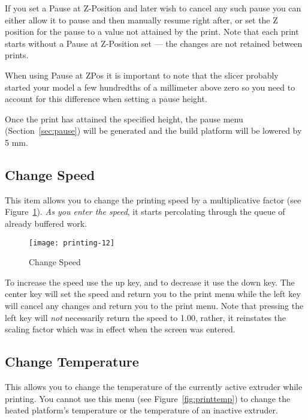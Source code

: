 If you set a Pause at Z-Position and later wish to cancel any such pause you can either allow it to pause and then manually resume right after, or set the Z position for the pause to a value not attained by the print.  Note that each print starts without a Pause at Z-Position set --- the changes are not retained between prints.

When using Pause at ZPos it is important to note that the \gls{slicer} probably started your model a few hundredths of a millimeter above zero so you need to account for this difference when setting a pause height.

Once the print has attained the specified height, the pause menu (Section~\ref{sec:pause}) will be generated and the build platform will be lowered by 5 mm.


\subsection{Change Speed}\label{sec:speed}

This item allows you to change the printing speed by a multiplicative factor (see Figure~\ref{fig:speed}).  \emph{As you enter the speed}, it starts percolating through the queue of already buffered work.

\begin{figure}[!htbp]
  \centering
    \texttt{[image: printing-12]}
    \caption{Change Speed}
  \label{fig:speed}
\end{figure}

To increase the speed use the up key, and to decrease it use the down key.  The center key will set the speed and return you to the print menu while the left key will cancel any changes and return you to the print menu.  Note that pressing the left key will \emph{not} necessarily return the speed to 1.00, rather, it reinstates the scaling factor which was in effect when the screen was entered.


\subsection{Change Temperature}\label{sec:temp}

This allows you to change the temperature of the currently active extruder while printing.  You cannot use this menu (see Figure~\ref{fig:printtemp}) to change the heated platform's temperature or the temperature of an inactive extruder.

